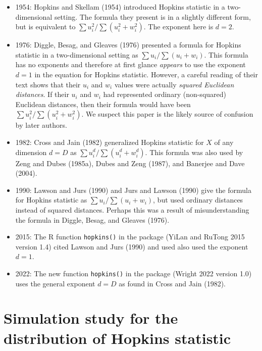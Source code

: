 \begin{itemize}
\item
  1954: Hopkins and Skellam (1954) introduced Hopkins statistic in a two-dimensional setting. The formula they present is in a slightly different form, but is equivalent to \(\sum u_i^2 \big/ \sum (u_i^2 + w_i^2 )\). The exponent here is \(d=2\).
\item
  1976: Diggle, Besag, and Gleaves (1976) presented a formula for Hopkins statistic in a two-dimensional setting as \(\sum u_i \big/ \sum (u_i + w_i )\). This formula has no exponents and therefore at first glance \emph{appears} to use the exponent \(d=1\) in the equation for Hopkins statistic. However, a careful reading of their text shows that their \(u_i\) and \(w_i\) values were actually \emph{squared Euclidean distances}. If their \(u_i\) and \(w_i\) had represented ordinary (non-squared) Euclidean distances, then their formula would have been \(\sum u_i^2 \big/ \sum (u_i^2 + w_i^2 )\). We suspect this paper is the likely source of confusion by later authors.
\item
  1982: Cross and Jain (1982) generalized Hopkins statistic for \(X\) of any dimension \(d=D\) as \(\sum u_i^d \big/ \sum (u_i^d + w_i^d )\). This formula was also used by Zeng and Dubes (1985a), Dubes and Zeng (1987), and Banerjee and Dave (2004).
\item
  1990: Lawson and Jurs (1990) and Jurs and Lawson (1990) give the formula for Hopkins statistic as \(\sum u_i \big/ \sum (u_i + w_i)\), but used ordinary distances instead of squared distances. Perhaps this was a result of misunderstanding the formula in Diggle, Besag, and Gleaves (1976).
\item
  2015: The R function \texttt{hopkins()} in the  package (YiLan and RuTong 2015 version 1.4) cited Lawson and Jurs (1990) and used also used the exponent \(d=1\).
\item
  2022: The new function \texttt{hopkins()} in the  package (Wright 2022 version 1.0) uses the general exponent \(d=D\) as found in Cross and Jain (1982).
\end{itemize}

\hypertarget{simulation-study-for-the-distribution-of-hopkins-statistic}{%
\section{Simulation study for the distribution of Hopkins statistic}\label{simulation-study-for-the-distribution-of-hopkins-statistic}}

